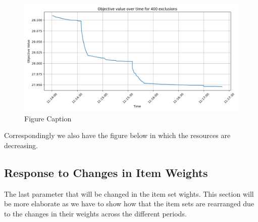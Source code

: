 \documentclass[preprint,12pt,authoryear]{elsarticle}
\begin{document}
\begin{figure}[H]%
\centering%
\includegraphics[width=1.0\textwidth]{../figures/objective-resource-increases.png}
\caption{Figure Caption}\label{fig:objective-resource-increases}
\end{figure}

Correspondingly we also have the figure below in which the resources are decreasing.

\subsection{Response to Changes in Item Weights}
The last parameter that will be changed in the item set wights. This section will be more elaborate as we have to show how that the item sets are rearranged due to the changes in their weights across the different periods.
\end{document}
